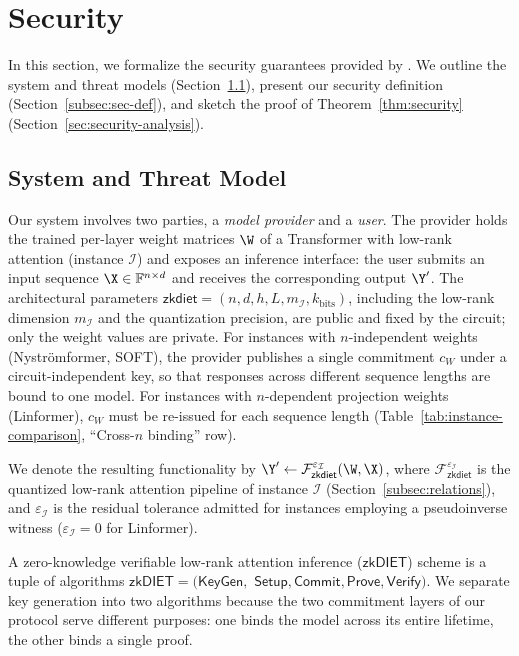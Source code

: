 \section{Security}
\label{sec:security}

In this section, we formalize the security guarantees provided by \name. We outline the system and threat models (Section~\ref{subsec:threat-model}), present our security definition (Section~\ref{subsec:sec-def}), and sketch the proof of Theorem~\ref{thm:security} (Section~\ref{sec:security-analysis}).

\subsection{System and Threat Model}
\label{subsec:threat-model}

Our system involves two parties, a \emph{model provider} and a \emph{user}. The provider holds the trained per-layer weight matrices $\W$ of a Transformer with low-rank attention (instance $\mathcal{I}$) and exposes an inference interface: the user submits an input sequence $\X \in \mathbb{F}^{n \times d}$ and receives the corresponding output $\Y'$. The architectural parameters $\mathsf{zkdiet} = (n, d, h, L, m_{\mathcal{I}}, k_{\mathrm{bits}})$, including the low-rank dimension $m_{\mathcal{I}}$ and the quantization precision, are public and fixed by the circuit; only the weight values are private. For instances with $n$-independent weights (Nystr\"{o}mformer, SOFT), the provider publishes a single commitment $c_{W}$ under a circuit-independent key, so that responses across different sequence lengths are bound to one model. For instances with $n$-dependent projection weights (Linformer), $c_W$ must be re-issued for each sequence length (Table~\ref{tab:instance-comparison}, ``Cross-$n$ binding'' row).

We denote the resulting functionality by $\Y' \leftarrow \mathcal{F}^{\varepsilon_\mathcal{I}}_{\mathsf{zkdiet}}(\W, \X)$, where $\mathcal{F}^{\varepsilon_\mathcal{I}}_{\mathsf{zkdiet}}$ is the quantized low-rank attention pipeline of instance $\mathcal{I}$ (Section~\ref{subsec:relations}), and $\varepsilon_\mathcal{I}$ is the residual tolerance admitted for instances employing a pseudoinverse witness ($\varepsilon_\mathcal{I}{=}0$ for Linformer).

A zero-knowledge verifiable low-rank attention inference ($\mathsf{zkDIET}$) scheme is a tuple of algorithms $\mathsf{zkDIET} = (\mathsf{KeyGen},$ $\mathsf{Setup}, \mathsf{Commit}, \mathsf{Prove}, \mathsf{Verify})$. We separate key generation into two algorithms because the two commitment layers of our protocol serve different purposes: one binds the model across its entire lifetime, the other binds a single proof.

